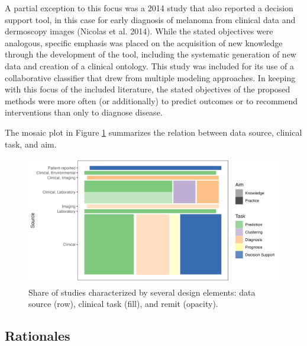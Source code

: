 \documentclass{article}
\begin{document}
A partial exception to this focus was a 2014 study that also reported a
decision support tool, in this case for early diagnosis of melanoma from
clinical data and dermoscopy images (Nicolas et al. 2014). While the
stated objectives were analogous, specific emphasis was placed on the
acquisition of new knowledge through the development of the tool,
including the systematic generation of new data and creation of a
clinical ontology. This study was included for its use of a
collaborative classifier that drew from multiple modeling approaches. In
keeping with this focus of the included literature, the stated
objectives of the proposed methods were more often (or additionally) to
predict outcomes or to recommend interventions than only to diagnose
disease.

The mosaic plot in Figure \ref{fig:properties} summarizes the relation
between data source, clinical task, and aim.

\begin{figure}

{\centering \includegraphics[width=1\linewidth]{Fig3} 

}

\caption{Share of studies characterized by several design elements: data source (row), clinical task (fill), and remit (opacity).}\label{fig:properties}
\end{figure}

\hypertarget{rationales}{%
\subsection{Rationales}\label{rationales}}
\end{document}
